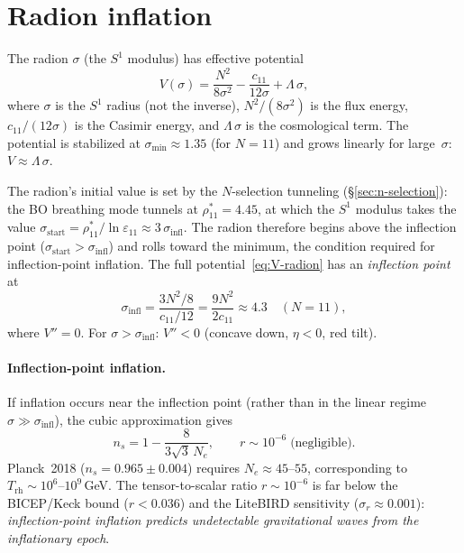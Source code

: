 \section{Radion inflation}
\label{sec:inflation}

The radion $\sigma$ (the $S^1$ modulus) has effective potential
\begin{equation}\label{eq:V-radion}
  V(\sigma) = \frac{N^2}{8\sigma^2} - \frac{c_{11}}{12\sigma} + \Lambda\,\sigma,
\end{equation}
where $\sigma$ is the $S^1$ radius (not the inverse),
$N^2/(8\sigma^2)$ is the flux energy,
$c_{11}/(12\sigma)$ is the Casimir energy,
and $\Lambda\,\sigma$ is the cosmological term.
The potential is stabilized at $\sigma_{\min} \approx 1.35$
(for $N = 11$) and grows linearly for large~$\sigma$:
$V \approx \Lambda\,\sigma$.

The radion's initial value is set by the $N$-selection
tunneling (\S\ref{sec:n-selection}): the BO breathing mode
tunnels at $\rho^*_{11} = 4.45$, at which the $S^1$ modulus
takes the value $\sigma_{\mathrm{start}} = \rho^*_{11}/\ln\varepsilon_{11}
\approx 3\,\sigma_{\mathrm{infl}}$.
The radion therefore begins above the inflection point
($\sigma_{\mathrm{start}} > \sigma_{\mathrm{infl}}$)
and rolls toward the minimum, the condition required
for inflection-point inflation.
The full potential~\eqref{eq:V-radion} has an \emph{inflection point} at
\begin{equation}\label{eq:sigma-infl}
  \sigma_{\mathrm{infl}} = \frac{3N^2/8}{c_{11}/12} = \frac{9N^2}{2c_{11}}
  \approx 4.3 \quad (N = 11),
\end{equation}
where $V'' = 0$.
For $\sigma > \sigma_{\mathrm{infl}}$: $V'' < 0$ (concave down,
$\eta < 0$, red tilt).

\paragraph{Inflection-point inflation.}
If inflation occurs near the inflection point (rather than in the
linear regime $\sigma \gg \sigma_{\mathrm{infl}}$), the cubic
approximation gives \citep{AllahverdiDuttaMazumdar2008}
\begin{equation}\label{eq:inflation-predictions}
  n_s = 1 - \frac{8}{3\sqrt{3}\,N_e},
  \qquad r \sim 10^{-6}\;\text{(negligible)}.
\end{equation}
Planck~2018 \citep{Planck2018} ($n_s = 0.965 \pm 0.004$) requires $N_e \approx 45$--$55$,
corresponding to $T_{\mathrm{rh}} \sim 10^6$--$10^9$\,GeV.
The tensor-to-scalar ratio $r \sim 10^{-6}$ is far below the
BICEP/Keck bound \citep{BICEP2021} ($r < 0.036$) and the LiteBIRD sensitivity
($\sigma_r \approx 0.001$): \emph{inflection-point inflation predicts
undetectable gravitational waves from the inflationary epoch}.

